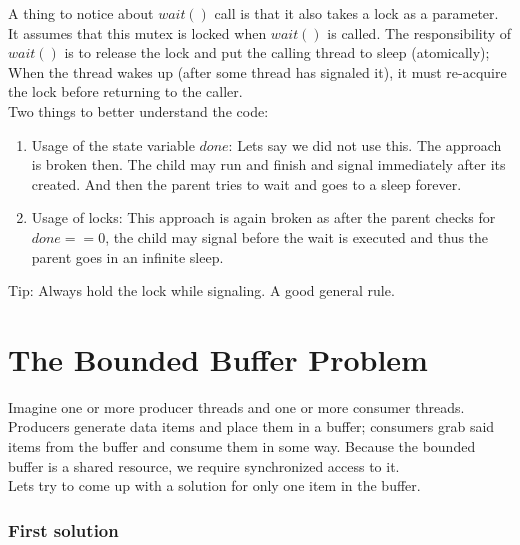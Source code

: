 A thing to notice about $wait()$ call is that it also takes a lock as a parameter.
It assumes that this mutex is locked when $wait()$ is called. The responsibility
of $wait()$ is to release the lock and put the calling thread to sleep (atomically);
When the thread wakes up (after some thread has signaled it), it must re-acquire
the lock before returning to the caller.\\

Two things to better understand the code:

\begin{enumerate}
    \item Usage of the state variable $done$: Lets say we did not use this. The
        approach is broken then. The child may run and finish and signal immediately
        after its created. And then the parent tries to wait and goes to a
        sleep forever.
    \item Usage of locks: This approach is again broken as after the parent 
        checks for $done == 0$, the child may signal before the wait is executed
        and thus the parent goes in an infinite sleep.
\end{enumerate}

Tip: Always hold the lock while signaling. A good general rule.\\

\section{The Bounded Buffer Problem}

Imagine one or more producer threads and one or more consumer threads. Producers 
generate data items and place them in a buffer; consumers grab said items from
the buffer and consume them in some way. Because the bounded buffer is a shared
resource, we require synchronized access to it.\\

Lets try to come up with a solution for only one item in the buffer.

\subsubsection{First solution}

